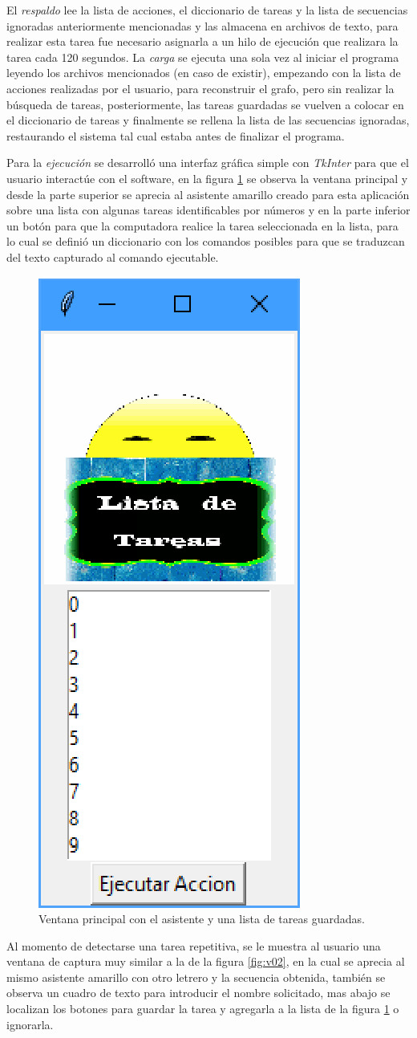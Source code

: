 El \emph{respaldo} lee la lista de acciones, el diccionario de tareas y la lista de secuencias ignoradas anteriormente mencionadas y las almacena en archivos de texto, para realizar esta tarea fue necesario asignarla a un hilo de ejecuci\'on que realizara la tarea cada 120 segundos. La \emph{carga} se ejecuta una sola vez al iniciar el programa leyendo los archivos mencionados (en caso de existir), empezando con la lista de acciones realizadas por el usuario, para reconstruir el grafo, pero sin realizar la b\'usqueda de tareas, posteriormente, las tareas guardadas se vuelven a colocar en el diccionario de tareas y finalmente se rellena la lista de las secuencias ignoradas, restaurando el sistema tal cual estaba antes de finalizar el programa.


Para la \emph{ejecuci\'on} se desarroll\'o una interfaz gr\'afica simple con \emph{TkInter} para que el usuario interact\'ue con el software, en la figura \ref{fig:v01} se observa la ventana principal y desde la parte superior se aprecia al asistente amarillo creado para esta aplicaci\'on sobre una lista con algunas tareas identificables por n\'umeros y en la parte inferior un bot\'on para que la computadora realice la tarea seleccionada en la lista, para lo cual se defini\'o un diccionario con los comandos posibles para que se traduzcan del texto capturado al comando ejecutable. 


\begin{figure}[!h]
\centering
\includegraphics[width=0.2\columnwidth]{chap4/Imagenes/ventana1.eps}
\caption{Ventana principal con el asistente y una lista de tareas guardadas.}
\label{fig:v01}
\end{figure} 

Al momento de detectarse una tarea repetitiva, se le muestra al usuario una ventana de captura muy similar a la de la figura \ref{fig:v02}, en la cual se aprecia al mismo asistente amarillo con otro letrero y la secuencia obtenida, tambi\'en se observa un cuadro de texto para introducir el nombre solicitado, mas abajo se localizan los botones para guardar la tarea y agregarla a la lista de la figura \ref{fig:v01} o ignorarla.


